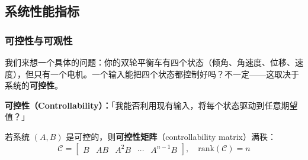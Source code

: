 \subsection{系统性能指标}

\subsubsection{可控性与可观性}

我们来想一个具体的问题：你的双轮平衡车有四个状态（倾角、角速度、位移、速度），但只有一个电机。一个输入能把四个状态都控制好吗？不一定——这取决于系统的\textbf{可控性}。

\textbf{可控性（Controllability）：}「我能否利用现有输入，将每个状态驱动到任意期望值？」

若系统 $(A, B)$ 是可控的，则\textbf{可控性矩阵}（controllability matrix）满秩：
\begin{equation}
\mathcal{C} = \begin{bmatrix} B & AB & A^2B & \cdots & A^{n-1}B \end{bmatrix}, \quad \text{rank}(\mathcal{C}) = n
\end{equation}

